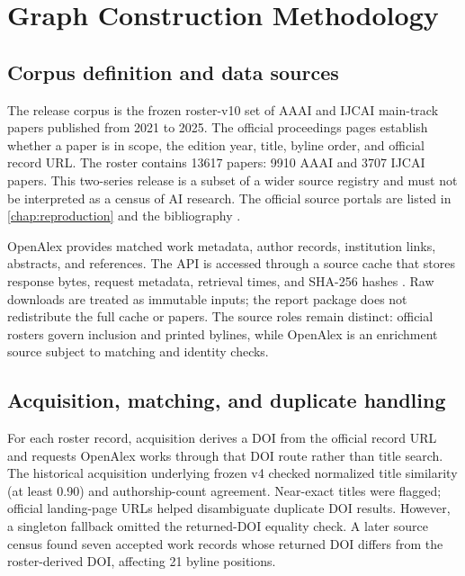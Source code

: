 \chapter{Graph Construction Methodology}
\label{chap:method}

\section{Corpus definition and data sources}

The release corpus is the frozen roster-v10 set of AAAI and IJCAI main-track
papers published from 2021 to 2025. The official proceedings pages establish
whether a paper is in scope, the edition year, title, byline order, and official
record URL. The roster contains \num{13617} papers: \num{9910} AAAI and \num{3707}
IJCAI papers. This two-series release is a subset of a wider source registry and
must not be interpreted as a census of AI research. The official source portals
are listed in \cref{chap:reproduction} and the bibliography
\citep{aaaiProceedings,ijcaiProceedings}.

OpenAlex provides matched work metadata, author records, institution links,
abstracts, and references. The API is accessed through a source cache that stores
response bytes, request metadata, retrieval times, and SHA-256 hashes
\citep{openalexapi,openalexworks}. Raw downloads are treated as immutable inputs;
the report package does not redistribute the full cache or papers. The source
roles remain distinct: official rosters govern inclusion and printed bylines,
while OpenAlex is an enrichment source subject to matching and identity checks.

\section{Acquisition, matching, and duplicate handling}

For each roster record, acquisition derives a DOI from the official record
URL and requests OpenAlex works through that DOI route rather than title search.
The historical acquisition underlying frozen v4 checked normalized title
similarity (at least 0.90) and authorship-count agreement. Near-exact titles were
flagged; official landing-page URLs helped disambiguate duplicate DOI results.
However, a singleton fallback omitted the returned-DOI equality check. A later
source census found seven accepted work records whose returned DOI differs from
the roster-derived DOI, affecting 21 byline positions.

